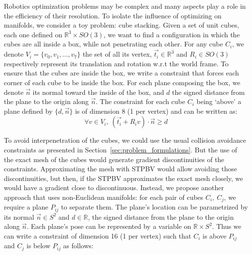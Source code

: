 Robotics optimization problems may be complex and many aspects play a role in the efficiency of their resolution.
To isolate the influence of optimizing on manifolds, we consider a toy problem: cube stacking.
Given a set of unit cubes, each one defined on $\mathbb{R}^3 \times SO(3)$, we want to find a configuration in which the cubes are all inside a box, while not penetrating each other.
For any cube $C_i$, we denote $V_i = \{v_0, v_1, \ldots, v_7\}$  the set of all its vertex, $\vec{t_i}\in\mathbb{R}^3$ and $R_i\in SO(3)$ respectively represent its translation and rotation w.r.t the world frame.
To ensure that the cubes are inside the box, we write a constraint that forces each corner of each cube to be inside the box.
For each plane composing the box, we denote $\vec{n}$ its normal toward the inside of the box, and $d$ the signed distance from the plane to the origin along $\vec{n}$.
The constraint for each cube $C_i$ being `above' a plane defined by $\{d, \vec{n}\}$ is of dimension 8 (1 per vertex) and can be written as:
\begin{equation}
  \forall v\in V_i,\ (\vec{t_i} + R_i v)\cdot \vec{n} \geq d
\end{equation}

To avoid interpenetration of the cubes, we could use the usual collision avoidance constraints as presented in Section~\ref{sec:problem_formulations}.
But the use of the exact mesh of the cubes would generate gradient discontinuities of the constraints.
Approximating the mesh with STPBV would allow avoiding those discontinuities, but then, if the STPBV approximates the exact mesh closely, we would have a gradient close to discontinuous.
Instead, we propose another approach that uses non-Euclidean manifolds: for each pair of cubes $C_i,\ C_j$, we require a plane $P_{ij}$ to separate them.
The plane's location can be parametrized by its normal $\vec{n}\in S^2$ and $d\in\mathbb{R}$, the signed distance from the plane to the origin along $\vec{n}$.
Each plane's pose can be represented by a variable on $\mathbb{R} \times S^2$.
Thus we can write a constraint of dimension 16 (1 per vertex) such that $C_i$ is above $P_{ij}$ and $C_j$ is below $P_{ij}$ as follows:

